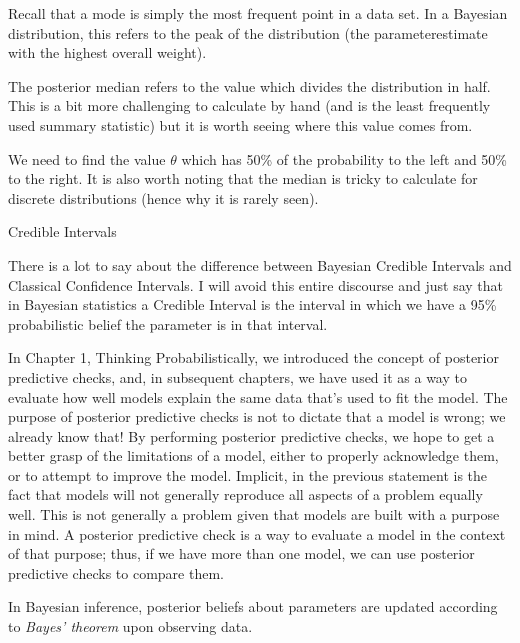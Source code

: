 Recall that a mode is simply the most frequent point in a data set. In a Bayesian distribution, this refers to the peak of the distribution (the parameterestimate with the highest overall weight). 

The posterior median refers to the value which divides the distribution in half. This is a bit more challenging to calculate by hand (and is the least frequently used summary statistic) but it is worth seeing where this value comes from.

We need to find the value $\theta$ which has 50\% of the probability to the left and 50\% to the right. It is also worth noting that the median is tricky to calculate for discrete distributions (hence why it is rarely seen).


Credible Intervals

There is a lot to say about the difference between Bayesian Credible Intervals and Classical Confidence Intervals. I will avoid this entire discourse and just say that in Bayesian statistics a Credible Interval is the interval in which we have a 95\% probabilistic belief the parameter is in that interval.

In Chapter 1, Thinking Probabilistically, we introduced the concept of posterior predictive checks, and, in subsequent chapters, we have used it as a way to evaluate how well models explain the same data that's used to fit the model. The purpose of posterior predictive checks is not to dictate that a model is wrong; we already know that! By performing posterior predictive checks, we hope to get a better grasp of the limitations of a model, either to properly acknowledge them, or to attempt to improve the model. Implicit, in the previous statement is the fact that models will not generally reproduce all aspects of a problem equally well. This is not generally a problem given that models are built with a purpose in mind. A posterior predictive check is a way to evaluate a model in the context of that purpose; thus, if we have more than one model, we can use posterior predictive checks to compare them.


In Bayesian inference, posterior beliefs about parameters are updated according to \textit{Bayes' theorem} upon observing data.  

